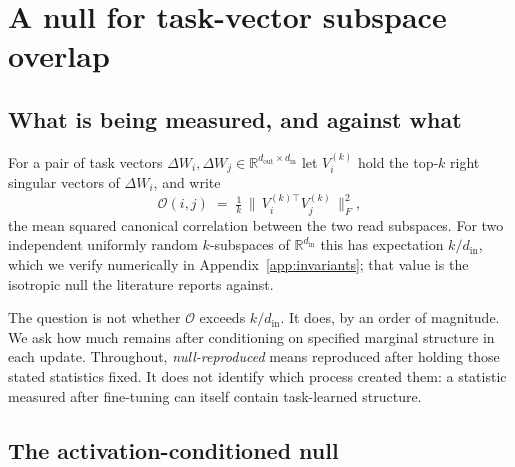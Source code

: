 \section{A null for task-vector subspace overlap}
\label{sec:method}

\subsection{What is being measured, and against what}

For a pair of task vectors $\Delta W_i, \Delta W_j \in \mathbb{R}^{d_{\mathrm{out}} \times d_{\mathrm{in}}}$
let $V_i^{(k)}$ hold the top-$k$ right singular vectors of $\Delta W_i$, and write
\begin{equation}
\mathcal{O}(i,j) \;=\; \tfrac{1}{k}\,\big\|\, V_i^{(k)\top} V_j^{(k)} \,\big\|_F^2 ,
\label{eq:overlap}
\end{equation}
the mean squared canonical correlation between the two read subspaces.
For two independent uniformly random $k$-subspaces of $\mathbb{R}^{d_{\mathrm{in}}}$ this has
expectation $k/d_{\mathrm{in}}$, which we verify numerically in
Appendix~\ref{app:invariants}; that value is the isotropic null the literature reports against.

The question is not whether $\mathcal{O}$ exceeds $k/d_{\mathrm{in}}$. It does, by an order of
magnitude. We ask how much remains after conditioning on specified marginal structure in each
update. Throughout, \emph{null-reproduced} means reproduced after holding those stated
statistics fixed. It does not identify which process created them: a statistic measured after
fine-tuning can itself contain task-learned structure.

\subsection{The activation-conditioned null}
\label{sec:null}

